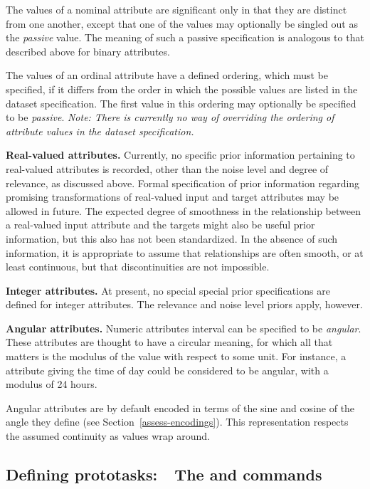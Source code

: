 The values of a nominal attribute are significant only in that they
are distinct from one another, except that one of the values may
optionally be singled out as the \emph{passive} value.  The meaning
of such a passive specification is analogous to that described above for
binary attributes.

The values of an ordinal attribute have a defined ordering, which must
be specified, if it differs from the order in which the possible
values are listed in the dataset specification.  The first value 
in this ordering may optionally be specified to be \emph{passive}.
\emph{Note: There is currently no way of overriding the ordering of
attribute values in the dataset specification.}

{\bf Real-valued attributes.\/} Currently, no specific prior
information pertaining to real-valued attributes is recorded, other
than the noise level and degree of relevance, as discussed above.
Formal specification of prior information regarding promising
transformations of real-valued input and target attributes may be
allowed in future.  The expected degree of smoothness in the
relationship between a real-valued input attribute and the targets
might also be useful prior information, but this also has not been
standardized.  In the absence of such information, it is appropriate
to assume that relationships are often smooth, or at least continuous,
but that discontinuities are not impossible.

{\bf Integer attributes.\/} At present, no special special prior 
specifications are defined for integer attributes.  The relevance
and noise level priors apply, however.

{\bf Angular attributes.\/} Numeric attributes interval can be
specified to be \emph{angular}.  These attributes are thought to have
a circular meaning, for which all that matters is the modulus of the
value with respect to some unit.  For instance, a attribute giving the
time of day could be considered to be angular, with a modulus of 24
hours.

Angular attributes are by default encoded in terms of the sine and
cosine of the angle they define (see Section~\ref{assess-encodings}).
This representation respects the assumed continuity as values wrap
around.

 
\subsection{Defining prototasks:~~The \dgenorder{} and \dgenproto{} 
            commands}\label{task-design}

